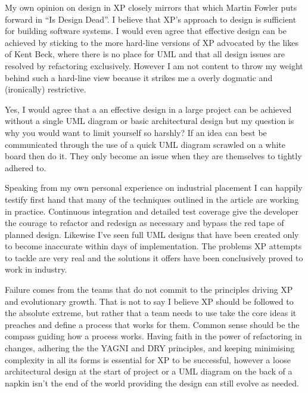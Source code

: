 \documentclass[paper=a4, fontsize=11pt]{scrartcl}	%
\numberwithin{equation}{section}															%
\numberwithin{figure}{section}																%
\numberwithin{table}{section}
\begin{document}
My own opinion on design in XP closely mirrors that which Martin Fowler puts forward in ``Is Design Dead''. I believe that XP's approach to design is sufficient for building software systems. I would even agree that effective design can be achieved by sticking to the more hard-line versions of XP advocated by the likes of Kent Beck, where there is no place for UML and that all design issues are resolved by refactoring exclusively. However I am not content to throw my weight behind such a hard-line view because it strikes me a overly dogmatic and (ironically) restrictive.

Yes, I would agree that a an effective design in a large project can be achieved without a single UML diagram or basic architectural  design but my question is why you would want to limit yourself so harshly? If an idea can best be communicated through the use of a quick UML diagram scrawled on a white board then do it. They only become an issue when they are themselves to tightly adhered to.

Speaking from my own personal experience on industrial placement I can happily testify first hand that many of the techniques outlined in the article are working in practice. Continuous integration and detailed test coverage give the developer the courage to refactor and redesign as necessary and bypass the red tape of planned design. Likewise I've seen full UML designs that have been created only to become inaccurate within days of implementation. The problems XP attempts to tackle are very real and the solutions it offers have been conclusively proved to work in industry. 

Failure comes from the teams that do not commit to the principles driving XP and evolutionary growth. That is not to say I believe XP should be followed to the absolute extreme, but rather that a team needs to use take the core ideas it preaches and define a process that works for them. Common sense should be the compass guiding how a process works. Having faith in the power of refactoring in changes, adhering the the YAGNI and DRY principles, and keeping minimising complexity in all its forms is essential for XP to be successful, however a loose architectural design at the start of project or a UML diagram on the back of a napkin isn't the end of the world providing the design can still evolve as needed.

\clearpage


\end{document}
